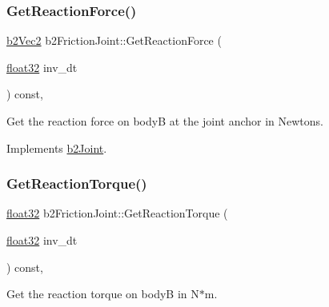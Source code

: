 \mbox{\label{classb2_friction_joint_a39d2c9ec06e6dd9733a8c4d72b4db2f0}} 
\subsubsection{\texorpdfstring{GetReactionForce()}{GetReactionForce()}}
{\footnotesize\ttfamily \mbox{\hyperlink{structb2_vec2}{b2\+Vec2}} b2\+Friction\+Joint\+::\+Get\+Reaction\+Force (\begin{DoxyParamCaption}\item[{\mbox{\hyperlink{b2_settings_8h_aacdc525d6f7bddb3ae95d5c311bd06a1}{float32}}}]{inv\+\_\+dt }\end{DoxyParamCaption}) const\hspace{0.3cm}{\ttfamily [override]}, {\ttfamily [virtual]}}



Get the reaction force on bodyB at the joint anchor in Newtons. 



Implements \mbox{\hyperlink{classb2_joint_a7e0eddefb9b69ad050b8ef6425838a74}{b2\+Joint}}.

\mbox{\label{classb2_friction_joint_a0a51dfa3bbc85408b9ccd63664230c99}} 
\subsubsection{\texorpdfstring{GetReactionTorque()}{GetReactionTorque()}}
{\footnotesize\ttfamily \mbox{\hyperlink{b2_settings_8h_aacdc525d6f7bddb3ae95d5c311bd06a1}{float32}} b2\+Friction\+Joint\+::\+Get\+Reaction\+Torque (\begin{DoxyParamCaption}\item[{\mbox{\hyperlink{b2_settings_8h_aacdc525d6f7bddb3ae95d5c311bd06a1}{float32}}}]{inv\+\_\+dt }\end{DoxyParamCaption}) const\hspace{0.3cm}{\ttfamily [override]}, {\ttfamily [virtual]}}



Get the reaction torque on bodyB in N$\ast$m. 



